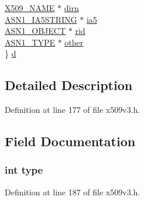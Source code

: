\begin{DoxyCompactItemize}
\begin{tabbing}
\>\hyperlink{crypto_2ossl__typ_8h_a5c5fc036757e87b9bd163d0221696533}{X509\_NAME} $\ast$ \hyperlink{struct_g_e_n_e_r_a_l___n_a_m_e__st_a462daff7bb881068b0f7325dd9880c49}{dirn}\\
\>\hyperlink{crypto_2ossl__typ_8h_a0d915c339a64c1c9871d5404e51c44fd}{ASN1\_IA5STRING} $\ast$ \hyperlink{struct_g_e_n_e_r_a_l___n_a_m_e__st_a36f202e5a44ab80b2e851e95257b4636}{ia5}\\
\>\hyperlink{crypto_2ossl__typ_8h_ae3fda0801e4c8e250087052bafb3ce2e}{ASN1\_OBJECT} $\ast$ \hyperlink{struct_g_e_n_e_r_a_l___n_a_m_e__st_aa9bbb5c9aaaedcb06be0da2c59b2e19d}{rid}\\
\>\hyperlink{crypto_2asn1_2asn1_8h_a7895e03d9fee2bc4963faf2a31a9439e}{ASN1\_TYPE} $\ast$ \hyperlink{struct_g_e_n_e_r_a_l___n_a_m_e__st_a913b5f8be6ebbc8d847d25c9279ee3d2}{other}\\
\} \hyperlink{struct_g_e_n_e_r_a_l___n_a_m_e__st_a148cf70e1baaa2460ba0d7503e3abf88}{d}\\

\end{tabbing}\end{DoxyCompactItemize}


\subsection{Detailed Description}


Definition at line 177 of file x509v3.\+h.



\subsection{Field Documentation}
\subsubsection[{\texorpdfstring{type}{type}}]{\setlength{\rightskip}{0pt plus 5cm}int type}\hypertarget{struct_g_e_n_e_r_a_l___n_a_m_e__st_ac765329451135abec74c45e1897abf26}{}\label{struct_g_e_n_e_r_a_l___n_a_m_e__st_ac765329451135abec74c45e1897abf26}


Definition at line 187 of file x509v3.\+h.

